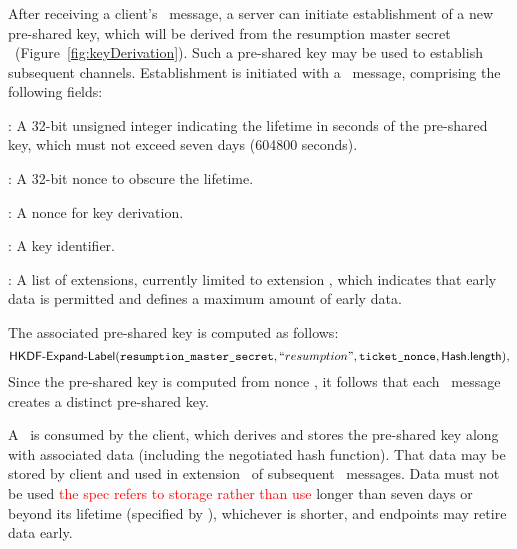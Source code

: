 \subsubsection{\NewSessionTicket}\label{sec:NST}

After receiving a client's \Finished\ message, a server can initiate establishment 
of a new pre-shared key, which will be derived from the resumption master secret
\TLSresumptionMasterSecret\ (Figure~\ref{fig:keyDerivation}). 
Such a pre-shared key may be used to establish subsequent channels. Establishment 
is initiated with a \NewSessionTicket\ message, comprising the following fields:

\begin{description}
\item \TLSticketLifetime: A 32-bit unsigned integer indicating the lifetime 
      in seconds %
      of the pre-shared key, which must not exceed seven days (604800 seconds).

\item \TLSticketAgeAdd: A 32-bit nonce to obscure the lifetime.

\item \TLSticketNonce: A nonce for key derivation.

\item \TLSticket: A key identifier. 

\item \TLSextensions: A list of extensions, currently limited to extension \TLSearlyData, 
  which indicates that early data is permitted and defines a maximum amount 
  of early data.

\end{description}

\begin{sloppypar}
\noindent
The associated pre-shared key is computed as follows:
\[
  \textsf{HKDF-Expand-Label}(\texttt{resumption\_master\_secret}, ``resumption", \texttt{ticket\_nonce}, \textsf{Hash}\textsf{.length}),
\]
Since the pre-shared key is computed from nonce \TLSticketNonce, it follows 
that each \NewSessionTicket\ message creates a distinct pre-shared key.
\end{sloppypar}

A \NewSessionTicket\ is consumed by the client, which derives and stores 
the pre-shared key along with associated data (including the negotiated 
hash function). That data may be stored by client and used in 
extension \TLSpsk\ of subsequent \ClientHello\ messages.
Data must not be used 
\ifSpecNotes
\textcolor{red}{the spec refers to storage rather than use}
\fi
longer than seven days or beyond its lifetime (specified by \TLSticketLifetime), 
whichever is shorter, and endpoints may retire data early.


